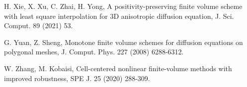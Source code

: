 \documentclass[times,review,preprint,authoryear]{elsarticle}
\begin{document}
\begin{thebibliography}{100}
H. Xie, X. Xu, C. Zhai, H. Yong, A positivity-preserving finite volume scheme with least square interpolation for 3D anisotropic diffusion equation, J. Sci. Comput. 89 (2021) 53.

G. Yuan, Z. Sheng, Monotone finite volume schemes for diffusion equations on polygonal meshes, J. Comput. Phys. 227 (2008) 6288-6312.


W. Zhang, M. Kobaisi, Cell-centered nonlinear finite-volume methods with improved robustness, SPE J. 25 (2020) 288-309.



\end{thebibliography}
\end{document}
